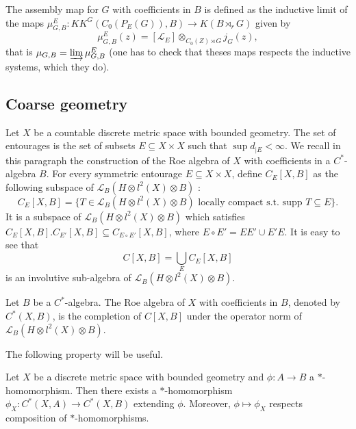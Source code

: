 \begin{definition}\label{projection}
The assembly map for $G$ with coefficients in $B$ is defined as the inductive limit of the maps $\mu_{G,B}^{E} : KK^G(C_0(P_E(G)),B)\rightarrow K(B\rtimes_r G)$ given by
\[\mu_{G,B}^{E} (z)=[\mathcal L_E]\otimes_{C_0(Z)\rtimes G} j_G(z),\]
that is $\mu_{G,B} = \varinjlim \mu_{G,B}^{E}$ (one has to check that theses maps respects the inductive systems, which they do).\\
\end{definition}

\subsection{Coarse geometry}

Let $X$ be a countable discrete metric space with bounded geometry. The set of entourages is the set of subsets $E \subseteq X\times X$ such that $\sup d_{|E}<\infty$. We recall in this paragraph the construction of the Roe algebra of $X$ with coefficients in a $C^*$-algebra $B$. For every symmetric entourage $E\subseteq X\times X$, define $C_E[X,B]$ as the following subspace of $\mathcal L_B(H\otimes l^2(X)\otimes B)$ :
\[C_E[X,B] = \{T\in \mathcal L_B(H\otimes l^2(X)\otimes B) \text{ locally compact  s.t. supp }T\subseteq E \}.\]
It is a subspace of $\mathcal L_B(H\otimes l^2(X)\otimes B)$ which satisfies $C_E[X,B].C_{E'}[X,B]\subseteq C_{E\circ E'}[X,B]$, where $E\circ E' = EE'\cup E'E$. It is easy to see that 
\[C[X,B] = \bigcup_{E} C_E[X,B]\] 
is an involutive sub-algebra of $\mathcal L_B(H\otimes l^2(X)\otimes B)$.

\begin{definition}
Let $B$ be a $C^*$-algebra. The Roe algebra of $X$ with coefficients in $B$, denoted by $C^*(X,B)$, is the completion of $C[X,B]$ under the operator norm of $\mathcal L_B(H\otimes l^2(X)\otimes B)$. 
\end{definition} 

The following property will be useful.

\begin{thm}\label{Xfunctor}
Let $X$ be a discrete metric space with bounded geometry and $\phi : A\rightarrow B$ a $*$-homomorphism. Then there exists a $*$-homomorphism $\phi_X : C^*(X,A)\rightarrow C^*(X,B)$ extending $\phi$. Moreover, $\phi\mapsto \phi_X$ respects composition of $*$-homomorphisms.
\end{thm}


